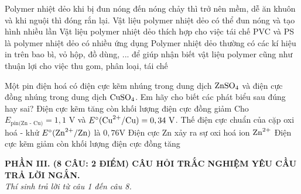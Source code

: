 \documentclass[11pt,a4paper]{article}
\begin{document}
\begin{ex}
Polymer nhiệt dẻo khi bị đun nóng đến nóng chảy thì trở nên mềm, dễ ăn khuôn và khi nguội thì đóng rắn lại.
\choiceTF
{\True Vật liệu polymer nhiệt dẻo có thể đun nóng và tạo hình nhiều lần}
{\True Vật liệu polymer nhiệt dẻo thích hợp cho việc tái chế}
{\True PVC và PS là polymer nhiệt dẻo có nhiều ứng dụng}
{\True Polymer nhiệt dẻo thường có các kí hiệu in trên bao bì, vỏ hộp, đồ dùng, ... để giúp nhận biết vật liệu polymer cũng như thuận lợi cho việc thu gom, phân loại, tái chế}

\end{ex}
\begin{ex}
Một pin điện hoá có điện cực kẽm nhúng trong dung dịch $\ce{ZnSO4}$ và điện cực đồng nhúng trong dung dịch $\ce{CuSO4}$. Em hãy cho biết các phát biểu sau đúng hay sai?
\choiceTF
{Điện cực kẽm tăng còn khối lượng điện cực đồng giảm}
{Cho $E_\text{pin(Zn - Cu)} = 1,1\text{ V}$ và $E^\circ(\ce{Cu^2+}/\ce{Cu}) = 0,34\text{ V}$. Thế điện cực chuẩn của cặp oxi hoá - khử $E^\circ(\ce{Zn^2+}/\ce{Zn})$ là $0,76\text{V}$}
{Điện cực Zn xảy ra sự oxi hoá ion $\ce{Zn^2+}$}
{\True Điện cực kẽm giảm còn khối lượng điện cực đồng tăng}

\end{ex}
\vspace{4pt}
\noindent
{\color{mainGreen}\textbf{\large PHẦN III. (8 CÂU: 2 ĐIỂM) CÂU HỎI TRẮC NGHIỆM YÊU CẦU TRẢ LỜI NGẮN.}}\\
\textit{\small Thí sinh trả lời từ câu 1 đến câu 8.}
\vspace{2pt}
\end{document}
